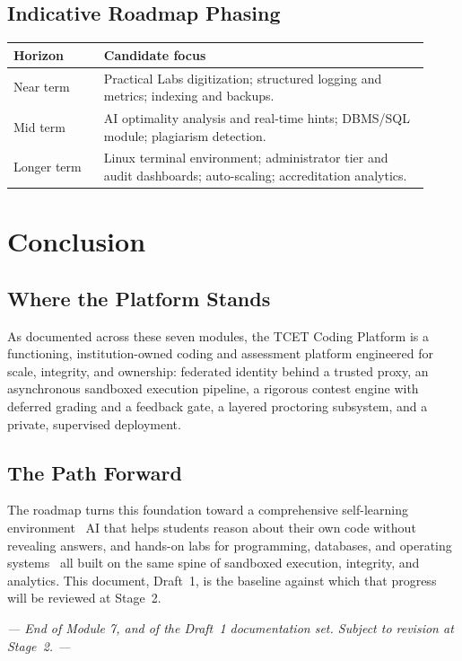 \documentclass[12pt,a4paper,oneside]{report}
\begin{document}
\section{Indicative Roadmap Phasing}
\begin{longtable}{@{}p{0.20\linewidth} p{0.72\linewidth}@{}}
\toprule
\textbf{Horizon} & \textbf{Candidate focus}\\
\midrule
\endhead
Near term & Practical Labs digitization; structured logging and metrics; indexing and backups.\\
Mid term & AI optimality analysis and real-time hints; DBMS/SQL module; plagiarism detection.\\
Longer term & Linux terminal environment; administrator tier and audit dashboards; auto-scaling; accreditation analytics.\\
\bottomrule
\end{longtable}

\chapter{Conclusion}
\section{Where the Platform Stands}
As documented across these seven modules, the TCET Coding Platform is a
functioning, institution-owned coding and assessment platform engineered for
scale, integrity, and ownership: federated identity behind a trusted proxy, an
asynchronous sandboxed execution pipeline, a rigorous contest engine with
deferred grading and a feedback gate, a layered proctoring subsystem, and a
private, supervised deployment.

\section{The Path Forward}
The roadmap turns this foundation toward a comprehensive self-learning
environment \textemdash\ AI that helps students reason about their own code
without revealing answers, and hands-on labs for programming, databases, and
operating systems \textemdash\ all built on the same spine of sandboxed
execution, integrity, and analytics. This document, Draft~1, is the baseline
against which that progress will be reviewed at Stage~2.

\vspace{0.8cm}
\begin{center}
\textit{--- End of Module 7, and of the Draft~1 documentation set. Subject to revision at Stage~2. ---}
\end{center}
\end{document}

